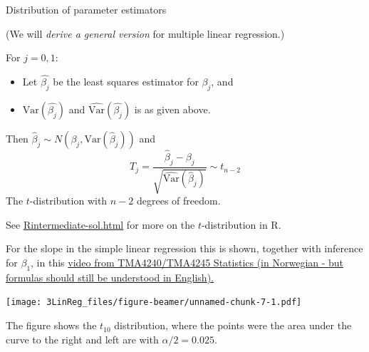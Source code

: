 \documentclass[10pt,ignorenonframetext,]{beamer}
\providecommand{\tightlist}{%
  \setlength{\itemsep}{0pt}\setlength{\parskip}{0pt}}
\begin{document}
\begin{frame}

\begin{block}{Distribution of parameter estimators}

(We will \emph{derive a general version} for multiple linear
regression.)

For \(j=0,1\):

\begin{itemize}
\tightlist
\item
  Let \(\hat{\beta_j}\) be the least squares estimator for \(\beta_j\),
  and
\item
  \(\text{Var}(\hat{\beta_j})\) and
  \(\widehat{\text{Var}}(\hat{\beta_j})\) is as given above.
\end{itemize}

Then \(\hat{\beta}_j \sim N(\beta_j,\text{Var}(\hat{\beta}_j))\) and
\[T_j =\frac{\hat{\beta}_j-\beta_j}{\sqrt{\widehat{\text{Var}}(\hat{\beta}_j)}} \sim t_{n-2}\]
The \(t\)-distribution with \(n-2\) degrees of freedom.

See
\href{https://wwww.math.ntnu.no/emner/TMA4268/2018v/1Intro/Rintermediate-sol.html}{Rintermediate-sol.html}
for more on the \(t\)-distribution in R.

For the slope in the simple linear regression this is shown, together
with inference for \(\beta_1\), in this
\href{https://mediasite.ntnu.no/Mediasite/Play/2e9a209c58874e75bd47e3c5e0b7b4e81d?catalog=0fce6173-7a98-4db7-84b7-50cba3a3a341}{video
from TMA4240/TMA4245 Statistics (in Norwegian - but formulas should
still be understood in English).}

\end{block}

\end{frame}

\begin{frame}

\texttt{[image: 3LinReg\_files/figure-beamer/unnamed-chunk-7-1.pdf]}

The figure shows the \(t_{10}\) distribution, where the points were the
area under the curve to the right and left are with \(\alpha/2=0.025\).

\end{frame}
\end{document}
